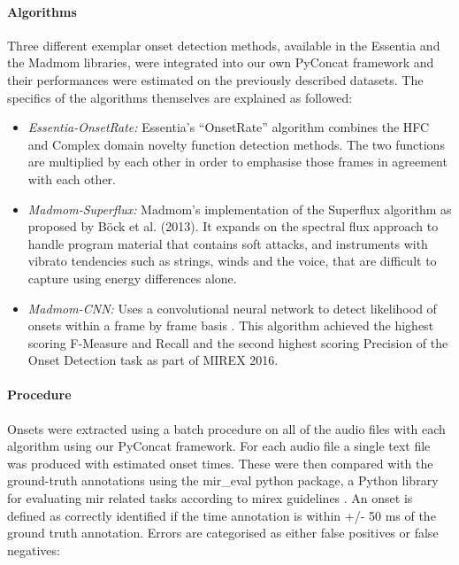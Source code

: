 \paragraph{Algorithms}

Three different exemplar onset detection methods, available in the Essentia \citep{Bogdanov2013} and the Madmom \citep{Bock2016} libraries, were integrated into our own PyConcat framework and their performances were estimated on the previously described datasets. The specifics of the algorithms themselves are explained as followed:

\begin{itemize}
  \item \textit{Essentia-OnsetRate:} Essentia’s “OnsetRate” algorithm combines the HFC and Complex domain novelty function detection methods. The two functions are multiplied by each other in order to emphasise those frames in agreement with each other. 
  \item \textit{Madmom-Superflux:} Madmom’s implementation of the Superflux algorithm as proposed by Böck et al. (2013). It expands on the spectral flux approach to handle program material that contains soft attacks, and instruments with vibrato tendencies such as strings, winds and the voice, that are difficult to capture using energy differences alone. 
  \item \textit{Madmom-CNN:} Uses a convolutional neural network to detect likelihood of onsets within a frame by frame basis \citep{Schluter2013, Schluter2014}. This algorithm achieved the highest scoring F-Measure and Recall and the second highest scoring Precision of the Onset Detection task as part of MIREX 2016.
\end{itemize}

\paragraph{Procedure}

Onsets were extracted using a batch procedure on all of the audio files with each algorithm using our PyConcat framework. For each audio file a single text file was produced with estimated onset times. These were then compared with the ground-truth annotations using the mir\_eval python package, a Python library for evaluating \acrshort{mir} related tasks according to \acrshort{mirex} guidelines \citep{Raffel2014}. An onset is defined as correctly identified if the time annotation is within +/- 50 ms of the ground truth annotation. Errors are categorised as either false positives or false negatives:

